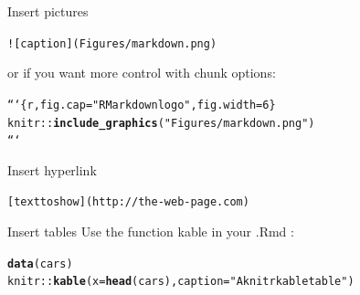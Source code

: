 \documentclass[10pt]{beamer}\usepackage[]{graphicx}\usepackage[]{color}
\makeatletter
\newcommand{\hlstr}[1]{\textcolor[rgb]{0.192,0.494,0.8}{#1}}%
\newcommand{\hlopt}[1]{\textcolor[rgb]{0,0,0}{#1}}%
\newcommand{\hlstd}[1]{\textcolor[rgb]{0.345,0.345,0.345}{#1}}%
\newcommand{\hlkwc}[1]{\textcolor[rgb]{0.333,0.667,0.333}{#1}}%
\newcommand{\hlkwd}[1]{\textcolor[rgb]{0.737,0.353,0.396}{\textbf{#1}}}%
\newenvironment{kframe}{%
 \def\at@end@of@kframe{}%
 \ifinner\ifhmode%
  \def\at@end@of@kframe{\end{minipage}}%
  \begin{minipage}{\columnwidth}%
 \fi\fi%
 \def\FrameCommand##1{\hskip\@totalleftmargin \hskip-\fboxsep
 \colorbox{shadecolor}{##1}\hskip-\fboxsep
     \hskip-\linewidth \hskip-\@totalleftmargin \hskip\columnwidth}%
 \MakeFramed {\advance\hsize-\width
   \@totalleftmargin\z@ \linewidth\hsize
   \@setminipage}}%
 {\par\unskip\endMakeFramed%
 \at@end@of@kframe}
\newenvironment{knitrout}{}{} %
\makeatother
\begin{document}
\begin{frame}[fragile]{Insert pictures}

\begin{knitrout}\small
{}\color{fgcolor}\begin{kframe}
\begin{alltt}
![caption](Figures/markdown.png)
\end{alltt}
\end{kframe}
\end{knitrout}

or if you want more control with chunk options:

\begin{knitrout}\small
{}\color{fgcolor}\begin{kframe}
\begin{alltt}
```\{r, fig.cap=\hlstr{"R Markdown logo"}, fig.width=6\}
knitr::\hlkwd{include_graphics}(\hlstr{"Figures/markdown.png"})
```
\end{alltt}
\end{kframe}
\end{knitrout}


\end{frame}

\begin{frame}[fragile]{Insert hyperlink}
\begin{knitrout}\small
{}\color{fgcolor}\begin{kframe}
\begin{alltt}
[text to show](http://the-web-page.com)
\end{alltt}
\end{kframe}
\end{knitrout}
\end{frame}


\begin{frame}[fragile]{Insert tables}
Use the function kable in your .Rmd :

\begin{knitrout}\small
{}\color{fgcolor}\begin{kframe}
\begin{alltt}
\hlkwd{data}\hlstd{(cars)}
\hlstd{knitr}\hlopt{::}\hlkwd{kable}\hlstd{(}\hlkwc{x} \hlstd{=} \hlkwd{head}\hlstd{(cars),} \hlkwc{caption} \hlstd{=} \hlstr{"A knitr kable table"}\hlstd{)}
\end{alltt}
\end{kframe}
\end{knitrout}
\end{frame}
\end{document}
